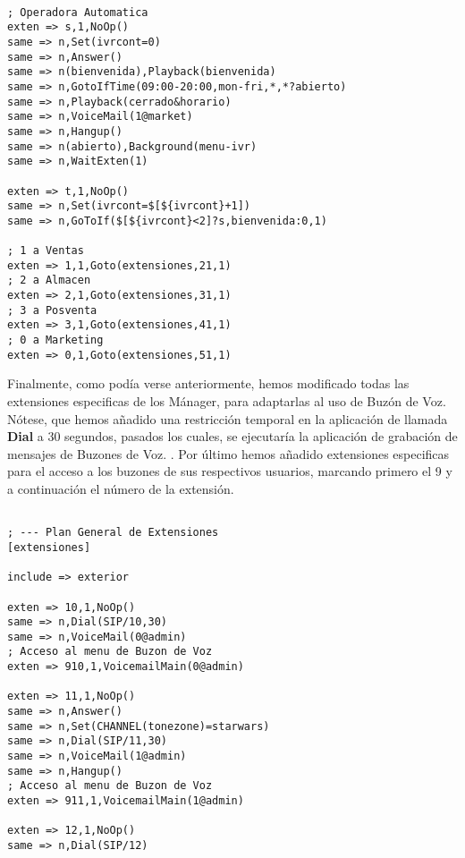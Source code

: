 
\begin{lstlisting}[style=bash,title={/etc/asterisk/extensions.conf}]

; Operadora Automatica
exten => s,1,NoOp()
same => n,Set(ivrcont=0)
same => n,Answer()
same => n(bienvenida),Playback(bienvenida)
same => n,GotoIfTime(09:00-20:00,mon-fri,*,*?abierto)
same => n,Playback(cerrado&horario)
same => n,VoiceMail(1@market)
same => n,Hangup()
same => n(abierto),Background(menu-ivr)
same => n,WaitExten(1)

exten => t,1,NoOp()
same => n,Set(ivrcont=$[${ivrcont}+1])
same => n,GoToIf($[${ivrcont}<2]?s,bienvenida:0,1)

; 1 a Ventas
exten => 1,1,Goto(extensiones,21,1)
; 2 a Almacen 
exten => 2,1,Goto(extensiones,31,1)
; 3 a Posventa
exten => 3,1,Goto(extensiones,41,1)
; 0 a Marketing
exten => 0,1,Goto(extensiones,51,1)

\end{lstlisting}

Finalmente, como podía verse anteriormente, hemos modificado todas las extensiones especificas de los Mánager, para adaptarlas al uso de Buzón de Voz. Nótese, que hemos añadido una restricción temporal en la aplicación de llamada \textbf{Dial} a 30 segundos, pasados los cuales, se ejecutaría la aplicación de grabación de mensajes de Buzones de Voz. . Por último hemos añadido extensiones especificas para el acceso a los buzones de sus respectivos usuarios, marcando primero el 9 y a continuación el número de la extensión.

\begin{lstlisting}[style=bash,title={/etc/asterisk/extensions.conf}]

; --- Plan General de Extensiones
[extensiones]

include => exterior

exten => 10,1,NoOp()
same => n,Dial(SIP/10,30)
same => n,VoiceMail(0@admin)
; Acceso al menu de Buzon de Voz
exten => 910,1,VoicemailMain(0@admin)

exten => 11,1,NoOp()
same => n,Answer()
same => n,Set(CHANNEL(tonezone)=starwars)
same => n,Dial(SIP/11,30)
same => n,VoiceMail(1@admin)
same => n,Hangup()
; Acceso al menu de Buzon de Voz
exten => 911,1,VoicemailMain(1@admin)

exten => 12,1,NoOp()
same => n,Dial(SIP/12)

\end{lstlisting}

